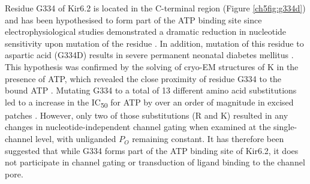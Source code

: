 Residue G334 of Kir6.2 is located in the C-terminal region (Figure \ref{ch5fig:g334d}) and has been hypothesised to form part of the ATP binding site since electrophysiological studies demonstrated a dramatic reduction in nucleotide sensitivity upon mutation of the residue \cite{drain_katp_1998, li_open_2002, li_ligand-dependent_2005}.
In addition, mutation of this residue to aspartic acid (G334D) results in severe permanent neonatal diabetes mellitus \cite{masia_atp-binding_2007-1}.
This hypothesis was confirmed by the solving of cryo-EM structures of K\ATP{} in the presence of ATP, which revealed the close proximity of residue G334 to the bound ATP \cite{lee_molecular_2017, martin_anti-diabetic_2017, li_structure_2017, puljung_cryo-electron_2018-1}.
Mutating G334 to a total of 13 different amino acid substitutions led to a increase in the IC\textsubscript{50} for ATP by over an order of magnitude in excised patches \cite{li_ligand-dependent_2005}.
However, only two of those substitutions (R and K) resulted in any changes in nucleotide-independent channel gating when examined at the single-channel level, with unliganded $P_O$ remaining constant.
It has therefore been suggested that while G334 forms part of the ATP binding site of Kir6.2, it does not participate in channel gating or transduction of ligand binding to the channel pore.

